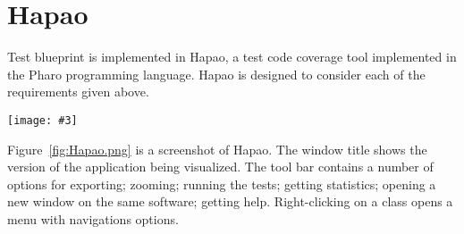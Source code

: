 \documentclass{sig-alternate}
\newcommand{\largefig}[4]{
	\begin{figure*}[#1]
		\centering
		\texttt{[image: \#3]}
		\caption{\label{fig:#3}#4}
	\end{figure*}}
\newcommand{\seclabel}[1]{\label{sec:#1}}
\newcommand{\figref}[1]{Figure~\ref{fig:#1}}
\newcommand{\hapao}{Hapao\xspace}
\begin{document}
\section{Hapao}

Test blueprint is implemented in Hapao, a test code coverage tool implemented in the Pharo programming language. \hapao is designed to consider each of the requirements given above. 

\largefig{}{0.5}{Hapao.png}{Hapao main window.}

\figref{Hapao.png} is a screenshot of Hapao. The window title shows the version of the application being visualized. The tool bar contains a number of options for exporting; zooming; running the tests; getting statistics; opening a new window on the same software; getting help. Right-clicking on a class opens a menu with navigations options.



%




%
\end{document}
